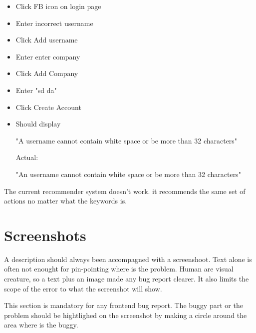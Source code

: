 \documentclass[a4paper,article,oneside]{memoir}
\begin{document}
\noindent{}

\begin{itemize}
  \item Click FB icon on login page
  \item Enter incorrect username
  \item Click Add username
  \item Enter enter company
  \item Click Add Company
  \item Enter "sd da"
  \item Click Create Account
  \item {Should display

"A username cannot contain white space or be more than 32 characters"

Actual:

"An username cannot contain white space or be more than 32 characters"}
\end{itemize}

\noindent{}

The current recommender system doesn't work. it recommends the same set of actions no matter what the keywords is.

        \section{Screenshots}
        A description should always been accompagned with a screenshoot. Text alone is often not enought for pin-pointing where is the problem. Human are visual creature, so a text plus an image made any bug report clearer. It also limits the scope of the error to what the screenshot will show.
        
        This section is mandatory for any frontend bug report. The buggy part or the problem should be hightlighed on the screenshot by making a circle around the area where is the buggy.
        
\noindent{}



\noindent{}  

\printglossary[nonumberlist]
\end{document}
